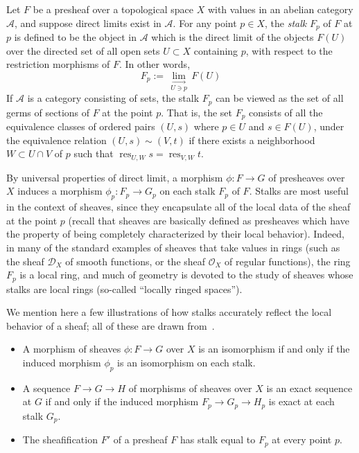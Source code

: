 \documentclass[12pt]{article}
\newcommand{\dlim}{\,\underset{U \ni p}{\underset{\longrightarrow}{\lim}}\,}
\newcommand{\A}{\mathcal{A}}
\newcommand{\lra}{\longrightarrow}
\renewcommand{\O}{\mathcal{O}}
\newcommand{\D}{\mathcal{D}}
\DeclareMathOperator{\res}{res}
\begin{document}
Let $F$ be a presheaf over a topological space $X$ with values in an abelian category $\A$, and suppose direct limits exist in $\A$. For any point $p \in X$, the {\em stalk} $F_p$ of $F$ at $p$ is defined to be the object in $\A$ which is the direct limit of the objects $F(U)$ over the directed set of all open sets $U \subset X$ containing $p$, with respect to the restriction morphisms of $F$. In other words,
$$
F_p := \dlim F(U)
$$
If $\A$ is a category consisting of sets, the stalk $F_p$ can be viewed as the set of all germs of sections of $F$ at the point $p$. That is, the set $F_p$ consists of all the equivalence classes of ordered pairs $(U,s)$ where $p \in U$ and $s \in F(U)$, under the equivalence relation $(U,s) \sim (V,t)$ if there exists a neighborhood $W \subset U \cap V$ of $p$ such that $\res_{U,W} s = \res_{V,W} t$.

By universal properties of direct limit, a morphism $\phi: F \lra G$ of presheaves over $X$ induces a morphism $\phi_p: F_p \lra G_p$ on each stalk $F_p$ of $F$. Stalks are most useful in the context of sheaves, since they encapsulate all of the local data of the sheaf at the point $p$ (recall that sheaves are basically defined as presheaves which have the property of being completely characterized by their local behavior). Indeed, in many of the standard examples of sheaves that take values in rings (such as the sheaf $\D_X$ of smooth functions, or the sheaf $\O_X$ of regular functions), the ring $F_p$ is a local ring, and much of geometry is devoted to the study of sheaves whose stalks are local rings (so-called ``locally ringed spaces''). 

We mention here a few illustrations of how stalks accurately reflect the local behavior of a sheaf; all of these are drawn from~\cite{hartshorne}.

\begin{itemize}
\item A morphism of sheaves $\phi: F \lra G$ over $X$ is an isomorphism if and only if the induced morphism $\phi_p$ is an isomorphism on each stalk.
\item A sequence $F \lra G \lra H$ of morphisms of sheaves over $X$ is an exact sequence at $G$ if and only if the induced morphism $F_p \lra G_p \lra H_p$ is exact at each stalk $G_p$.
\item The sheafification $F'$ of a presheaf $F$ has stalk equal to $F_p$ at every point $p$.
\end{itemize}
\begin{thebibliography}{9}
\end{thebibliography}
\end{document}
